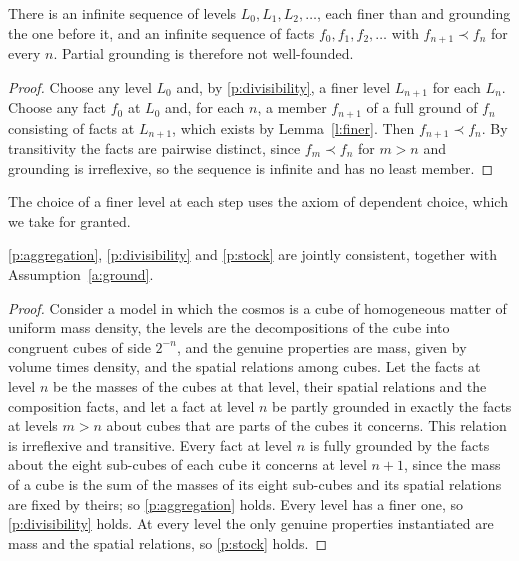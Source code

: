 \documentclass{situationist-preprint}
\begin{document}
\begin{corollary}[Descent]\label{c:descent}
There is an infinite sequence of levels $L_0, L_1, L_2, \dots$, each finer than and grounding the one before it, and an infinite sequence of facts $f_0, f_1, f_2, \dots$ with $f_{n+1} \prec f_n$ for every $n$. Partial grounding is therefore not well-founded.
\end{corollary}

\begin{proof}
Choose any level $L_0$ and, by \ref{p:divisibility}, a finer level $L_{n+1}$ for each $L_n$. Choose any fact $f_0$ at $L_0$ and, for each $n$, a member $f_{n+1}$ of a full ground of $f_n$ consisting of facts at $L_{n+1}$, which exists by Lemma~\ref{l:finer}. Then $f_{n+1} \prec f_n$. By transitivity the facts are pairwise distinct, since $f_m \prec f_n$ for $m > n$ and grounding is irreflexive, so the sequence is infinite and has no least member.
\end{proof}

The choice of a finer level at each step uses the axiom of dependent choice, which we take for granted.

\begin{proposition}\label{p:stockcons}
\ref{p:aggregation}, \ref{p:divisibility} and \ref{p:stock} are jointly consistent, together with Assumption~\ref{a:ground}.
\end{proposition}

\begin{proof}
Consider a model in which the cosmos is a cube of homogeneous matter of uniform mass density, the levels are the decompositions of the cube into congruent cubes of side $2^{-n}$, and the genuine properties are mass, given by volume times density, and the spatial relations among cubes. Let the facts at level $n$ be the masses of the cubes at that level, their spatial relations and the composition facts, and let a fact at level $n$ be partly grounded in exactly the facts at levels $m > n$ about cubes that are parts of the cubes it concerns. This relation is irreflexive and transitive. Every fact at level $n$ is fully grounded by the facts about the eight sub-cubes of each cube it concerns at level $n+1$, since the mass of a cube is the sum of the masses of its eight sub-cubes and its spatial relations are fixed by theirs; so \ref{p:aggregation} holds. Every level has a finer one, so \ref{p:divisibility} holds. At every level the only genuine properties instantiated are mass and the spatial relations, so \ref{p:stock} holds.
\end{proof}
\end{document}
